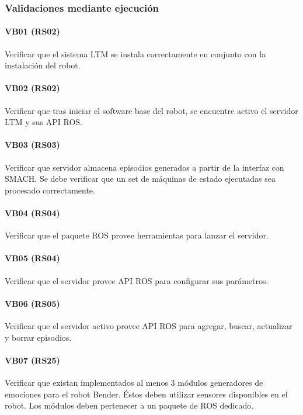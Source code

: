 \subsubsection{Validaciones mediante ejecución}

\paragraph{VB01 (RS02)}
Verificar que el sistema LTM se instala correctamente en conjunto con la instalación del robot.

\paragraph{VB02 (RS02)}
Verificar que tras iniciar el software base del robot, se encuentre activo el servidor LTM y sus API ROS.

\paragraph{VB03 (RS03)}
Verificar que servidor almacena episodios generados a partir de la interfaz con SMACH. Se debe verificar que un set de máquinas de estado ejecutadas sea procesado correctamente.

\paragraph{VB04 (RS04)}
Verificar que el paquete ROS provee herramientas para lanzar el servidor.

\paragraph{VB05 (RS04)}
Verificar que el servidor provee API ROS para configurar sus parámetros.

\paragraph{VB06 (RS05)}
Verificar que el servidor activo provee API ROS para agregar, buscar, actualizar y borrar episodios. 

\paragraph{VB07 (RS25)}
Verificar que existan implementados al menos 3 módulos generadores de emociones para el robot Bender. Éstos deben utilizar sensores disponibles en el robot. Los módulos deben pertenecer a un paquete de ROS dedicado.


